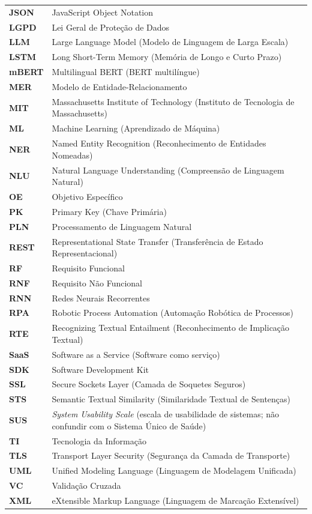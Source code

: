 \documentclass[12pt,a4paper]{extarticle}
\begin{document}
\begin{xltabular}{\textwidth}{@{}p{1.6cm}Y@{}}
\textbf{JSON} & JavaScript Object Notation \\
\textbf{LGPD} & Lei Geral de Proteção de Dados \\
\textbf{LLM} & Large Language Model (Modelo de Linguagem de Larga Escala) \\
\textbf{LSTM} & Long Short-Term Memory (Memória de Longo e Curto Prazo) \\
\textbf{mBERT} & Multilingual BERT (BERT multilíngue) \\
\textbf{MER} & Modelo de Entidade-Relacionamento \\
\textbf{MIT} & Massachusetts Institute of Technology (Instituto de Tecnologia de Massachusetts) \\
\textbf{ML} & Machine Learning (Aprendizado de Máquina) \\
\textbf{NER} & Named Entity Recognition (Reconhecimento de Entidades Nomeadas) \\
\textbf{NLU} & Natural Language Understanding (Compreensão de Linguagem Natural) \\
\textbf{OE} & Objetivo Específico \\
\textbf{PK} & Primary Key (Chave Primária) \\
\textbf{PLN} & Processamento de Linguagem Natural \\
\textbf{REST} & Representational State Transfer (Transferência de Estado Representacional) \\
\textbf{RF} & Requisito Funcional \\
\textbf{RNF} & Requisito Não Funcional \\
\textbf{RNN} & Redes Neurais Recorrentes \\
\textbf{RPA} & Robotic Process Automation (Automação Robótica de Processos) \\
\textbf{RTE} & Recognizing Textual Entailment (Reconhecimento de Implicação Textual) \\
\textbf{SaaS} & Software as a Service (Software como serviço) \\
\textbf{SDK} & Software Development Kit \\
\textbf{SSL} & Secure Sockets Layer (Camada de Soquetes Seguros) \\
\textbf{STS} & Semantic Textual Similarity (Similaridade Textual de Sentenças) \\
\textbf{SUS} & \textit{System Usability Scale} (escala de usabilidade de sistemas; não confundir com o Sistema Único de Saúde) \\
\textbf{TI} & Tecnologia da Informação \\
\textbf{TLS} & Transport Layer Security (Segurança da Camada de Transporte) \\
\textbf{UML} & Unified Modeling Language (Linguagem de Modelagem Unificada) \\
\textbf{VC} & Validação Cruzada \\
\textbf{XML} & eXtensible Markup Language (Linguagem de Marcação Extensível) \\
\end{xltabular}
\end{document}
